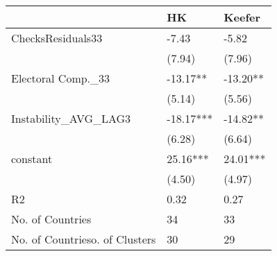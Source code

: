 \begin{tabular}{lll}
  \hline
 & HK & Keefer \\ 
  \hline
ChecksResiduals33 & -7.43 & -5.82 \\ 
   & (7.94) & (7.96) \\ 
  Electoral Comp.\_33 & -13.17** & -13.20** \\ 
   & (5.14) & (5.56) \\ 
  Instability\_AVG\_LAG3 & -18.17*** & -14.82** \\ 
   & (6.28) & (6.64) \\ 
  constant & 25.16*** & 24.01*** \\ 
   & (4.50) & (4.97) \\ 
  R2 & 0.32 & 0.27 \\ 
  No. of Countries & 34 & 33 \\ 
  No. of Countrieso. of Clusters & 30 & 29 \\ 
   \hline
\end{tabular}
